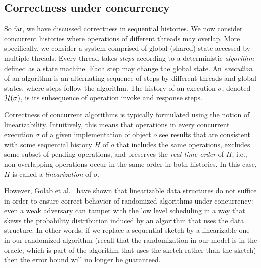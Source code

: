 \subsection{Correctness under concurrency}
\label{sub:proveCorrect}

So far, we have discussed correctness in sequential histories. We now consider concurrent histories 
where operations of different threads may overlap.  
% 
More specifically, we consider a system comprised of global (shared) state accessed by multiple threads. 
Every thread takes \emph{steps} according to a deterministic \emph{algorithm} 
defined as a state machine. Each step may change the global state.  
An \emph{execution} of an algorithm is an alternating sequence of steps 
by different threads and global states, where steps follow the algorithm. 
The history of an execution $\sigma$, denoted ${\cal H}(\sigma)$, 
is its subsequence of operation invoke and response steps.

Correctness of concurrent algorithms is typically formulated using the notion of linearizability. 
Intuitively, this means that operations in every concurrent execution $\sigma$ of a given implementation 
of object $o$ see results that are consistent with some sequential history $H$ of $o$
that includes the same operations, excludes some subset of pending operations,
and preserves the \emph{real-time order} of $H$, i.e., 
non-overlapping operations occur in the same order in both histories. 
In this case, $H$ is called a \emph{linearization} of $\sigma$.

However, Golab et al.~\cite{Wojciech} have shown that linearizable data structures  
do not suffice in order to ensure correct behavior of randomized algorithms under concurrency:
even a weak adversary can tamper with the low level scheduling in a way that 
skews the probability distribution induced by an algorithm that uses the data structure. 
In other words, if we replace a sequential sketch by a linearizable one in our randomized algorithm 
(recall that the randomization in our model is in the oracle, which is part of the algorithm that 
uses the sketch rather than the sketch) then the error bound will no longer be guaranteed.

